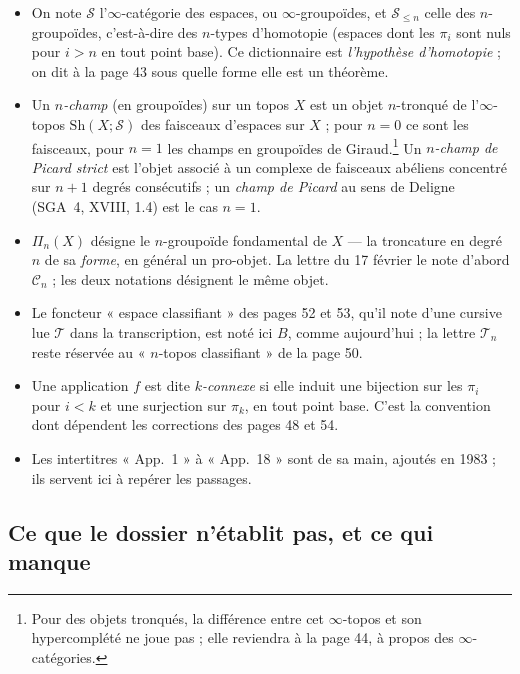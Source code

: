 \documentclass[11pt,a4paper]{article}
\begin{document}
\begin{itemize}
  \item On note $\mathcal{S}$ l'$\infty$-catégorie des espaces, ou
  $\infty$-groupoïdes, et $\mathcal{S}_{\leqslant n}$ celle des
  $n$-groupoïdes, c'est-à-dire des $n$-types d'homotopie (espaces dont les
  $\pi_i$ sont nuls pour $i > n$ en tout point base). Ce dictionnaire est
  \emph{l'hypothèse d'homotopie} ; on dit à la page 43 sous quelle forme elle
  est un théorème.
  \item Un \emph{$n$-champ} (en groupoïdes) sur un topos $X$ est un objet
  $n$-tronqué de l'$\infty$-topos $\mathrm{Sh}(X;\mathcal{S})$ des faisceaux
  d'espaces sur $X$ ; pour $n = 0$ ce sont les faisceaux, pour $n = 1$ les
  champs en groupoïdes de Giraud.\footnote{Pour des objets tronqués, la
  différence entre cet $\infty$-topos et son hypercomplété ne joue pas ;
  elle reviendra à la page 44, à propos des $\infty$-catégories.}
  Un \emph{$n$-champ de Picard strict} est l'objet associé à un complexe de
  faisceaux abéliens concentré sur $n+1$ degrés consécutifs ; un
  \emph{champ de Picard} au sens de Deligne (SGA~4, XVIII, 1.4) est le cas
  $n=1$.
  \item $\Pi_n(X)$ désigne le $n$-groupoïde fondamental de $X$ --- la
  troncature en degré $n$ de sa \emph{forme}, en général un pro-objet. La
  lettre du 17 février le note d'abord $\mathcal{C}_n$ ; les deux notations
  désignent le même objet.
  \item Le foncteur « espace classifiant » des pages 52 et 53, qu'il note
  d'une cursive lue $\mathcal{T}$ dans la transcription, est noté ici $B$,
  comme aujourd'hui ; la lettre $\mathcal{T}_n$ reste réservée au
  « $n$-topos classifiant » de la page 50.
  \item Une application $f$ est dite \emph{$k$-connexe} si elle induit une
  bijection sur les $\pi_i$ pour $i < k$ et une surjection sur $\pi_k$, en
  tout point base. C'est la convention dont dépendent les corrections des
  pages 48 et 54.
  \item Les intertitres « App.~1 » à « App.~18 » sont de sa main, ajoutés en
  1983 ; ils servent ici à repérer les passages.
\end{itemize}

\subsection*{Ce que le dossier n'établit pas, et ce qui manque}
\end{document}
